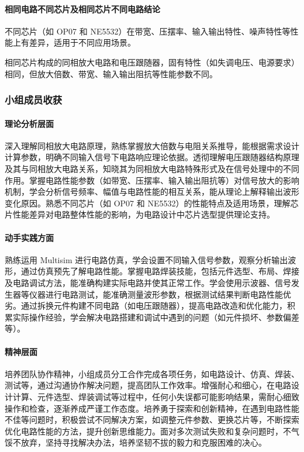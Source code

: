 \documentclass[./测控三级项目.tex]{subfiles} %
\begin{document}
			\paragraph{\qquad 相同电路不同芯片及相同芯片不同电路结论}
			不同芯片（如 OP07 和 NE5532）在带宽、压摆率、输入输出特性、噪声特性等性能上有差异，适用于不同应用场景。\par
			相同芯片构成的同相放大电路和电压跟随器，固有特性（如失调电压、电源要求）相同，但放大倍数、带宽、输入输出阻抗等性能参数不同。
		\subsubsection{小组成员收获}
			\paragraph{\qquad 理论分析层面}
			深入理解同相放大电路原理，熟练掌握放大倍数与电阻关系推导，能根据需求设计计算参数，明确不同输入信号下电路响应理论依据。透彻理解电压跟随器结构原理及其与同相放大电路关系，知晓其为同相放大电路特殊形式及在信号处理中的不同作用。掌握电路性能参数（如带宽、压摆率、输入输出阻抗等）对信号放大的影响机制，学会分析信号频率、幅值与电路性能的相互关系，能从理论上解释输出波形变化原因。熟悉不同芯片（如 OP07 和 NE5532）的性能特点及适用场景，理解芯片性能差异对电路整体性能的影响，为电路设计中芯片选型提供理论支持。
			\paragraph{\qquad 动手实践方面}
			熟练运用 Multisim 进行电路仿真，学会设置不同输入信号参数，观察分析输出波形，通过仿真预先了解电路性能。掌握电路焊装技能，包括元件选型、布局、焊接及电路调试方法，能准确构建实际电路并使其正常工作。学会使用示波器、信号发生器等仪器进行电路测试，能准确测量波形参数，根据测试结果判断电路性能优劣。通过拆换元件构建不同电路（如电压跟随器），提高电路改造和优化能力，积累实际操作经验，学会解决电路搭建和调试中遇到的问题（如元件损坏、参数偏差等）。
			\paragraph{\qquad 精神层面}
			培养团队协作精神，小组成员分工合作完成各项任务，如电路设计、仿真、焊装、测试等，通过沟通协作解决问题，提高团队工作效率。增强耐心和细心，在电路设计计算、元件选型、焊装调试等过程中，任何小失误都可能影响结果，需耐心细致操作和检查，逐渐养成严谨工作态度。培养勇于探索和创新精神，在遇到电路性能不佳等问题时，积极尝试不同解决方案，如调整元件参数、更换芯片等，不断探索优化电路性能的方法，提升创新思维能力。面对多次测试失败和复杂问题时，不气馁不放弃，坚持寻找解决办法，培养坚韧不拔的毅力和克服困难的决心。
			
	
	
\end{document}

